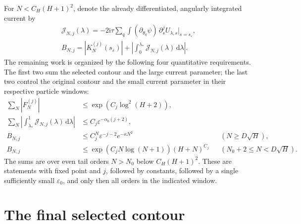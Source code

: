 \documentclass[11pt]{article}
\numberwithin{equation}{section}
\theoremstyle{definition}
\newcommand{\dd}{\,\mathrm d}
\newcommand{\ii}{\mathrm i}
\newcommand{\eps}{\varepsilon}
\begin{document}
For \(N<C_H(H+1)^2\), denote the already differentiated,
angularly integrated current by
\begin{gather*}
 \mathcal J_{N,j}(\lambda)
   =-2\ii\tau\sum_q\int(\partial_{\theta_q}\psi)\,
              \partial_s^j U_{\lambda,s}\big|_{s=s_\eps},\\
 B_{N,j}=|K_N^{(j)}(s_\eps)|
       +\left|\int_0^{\lambda_*}\mathcal J_{N,j}(\lambda)\dd\lambda\right|.
\end{gather*}
The remaining work is organized by the following four quantitative
requirements. The first two sum the selected contour and the large
current parameter; the last two control the original contour and the
small current parameter in their respective particle windows:
\begin{align}
 \sum_N|F_N^{(j)}|
   &\le \exp(C_j\log^2(H+2)),\label{eq:reqF}\\
 \sum_N\left|\int_{\lambda_*}^1
               \mathcal J_{N,j}(\lambda)\dd\lambda\right|
   &\le C_j\eps^{-\alpha_0(j+2)},\label{eq:reqLS}\\
 B_{N,j}
   &\le C_j^N\eps^{-j-2}e^{-\kappa N^2}
             &&(N\ge D\sqrt H),\label{eq:reqhigh}\\
 B_{N,j}
   &\le \exp(C_jN\log(N+1))(H+N)^{C_j}
             &&(N_0+2\le N<D\sqrt H).\label{eq:reqinter}
\end{align}
The sums are over even tail orders \(N>N_0\) below \(C_H(H+1)^2\).
These are statements with fixed point and \(j\), followed by constants,
followed by a single sufficiently small \(\eps_0\), and only then all
orders in the indicated window.



\section{The final selected contour}
\label{sec:F}
\end{document}
